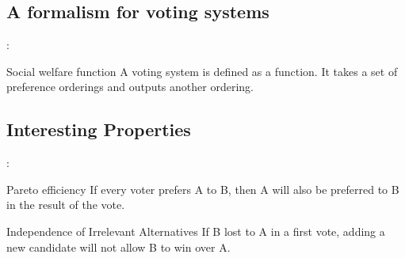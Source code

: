 \documentclass[utf8]{earlywinter}
\begin{document}
\subsection{A formalism for voting systems}
\begin{frame}{\secname: \subsecname}


%
%
%
  \begin{block}{Social welfare function}
    A voting system is defined as a function. It takes a set of preference orderings and outputs another ordering.
  \end{block}
 


\end{frame}

\subsection{Interesting Properties}
\begin{frame}{\secname: \subsecname}

  \begin{block}{Pareto efficiency}
    {If every voter prefers A to B, then A will also be preferred to B in the result of the vote.}
  \end{block}


  \begin{block}{Independence of Irrelevant Alternatives}
    {If B lost to A in a first vote, adding a new candidate will not allow B to win over A.}
  \end{block}
\end{frame}
\end{document}
